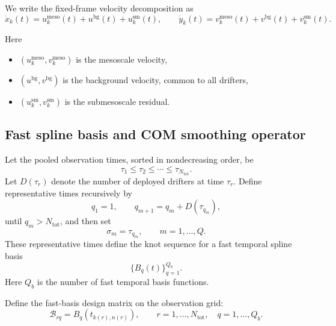 \documentclass{article}
\begin{document}
We write the fixed-frame velocity decomposition as
\begin{equation}
\dot{x}_k(t)=u_k^{\mathrm{meso}}(t)+u^{\mathrm{bg}}(t)+u_k^{\mathrm{sm}}(t),
\qquad
\dot{y}_k(t)=v_k^{\mathrm{meso}}(t)+v^{\mathrm{bg}}(t)+v_k^{\mathrm{sm}}(t).
\label{eq:full_fixed_model}
\end{equation}

Here
\begin{itemize}
    \item $(u_k^{\mathrm{meso}},v_k^{\mathrm{meso}})$ is the mesoscale velocity,
    \item $(u^{\mathrm{bg}},v^{\mathrm{bg}})$ is the background velocity, common to all drifters,
    \item $(u_k^{\mathrm{sm}},v_k^{\mathrm{sm}})$ is the submesoscale residual.
\end{itemize}

\subsection{Fast spline basis and COM smoothing operator}

Let the pooled observation times, sorted in nondecreasing order, be
\begin{equation}
\tau_1 \le \tau_2 \le \cdots \le \tau_{N_{\mathrm{tot}}}.
\end{equation}
Let $D(\tau_r)$ denote the number of deployed drifters at time $\tau_r$.
Define representative times recursively by
\begin{equation}
q_1=1,
\qquad
q_{m+1}=q_m+D(\tau_{q_m}),
\end{equation}
until $q_m>N_{\mathrm{tot}}$, and then set
\begin{equation}
\sigma_m=\tau_{q_m}, \qquad m=1,\dots,Q.
\end{equation}
These representative times define the knot sequence for a fast temporal spline basis
\begin{equation}
\{B_q(t)\}_{q=1}^{Q_b}.
\end{equation}
Here $Q_b$ is the number of fast temporal basis functions.


Define the fast-basis design matrix on the observation grid:
\begin{equation}
\mathcal{B}_{rq}=B_q\!\left(t_{k(r),n(r)}\right),
\qquad
r=1,\dots,N_{\mathrm{tot}}, \quad q=1,\dots,Q_b.
\label{eq:B_matrix}
\end{equation}
\end{document}
